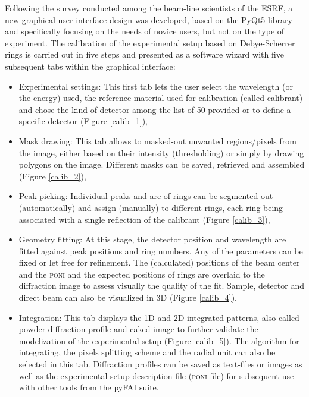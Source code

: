 \documentclass[preprint]{iucr}              %
\begin{document}
Following the survey conducted among the beam-line scientists of the ESRF, a
new graphical user interface design was developed, based on the PyQt5
library \cite{pyqt} and specifically focusing on the needs of novice users, but
not on the type of experiment.
The calibration of the experimental setup based on Debye-Scherrer rings 
is carried out in five steps and presented as a software wizard with five
subsequent tabs within the graphical interface:
\begin{itemize}
  \item{Experimental settings:} This first tab lets the user select
  the wavelength (or the energy) used, the reference material used
  for calibration (called calibrant) and chose the kind of detector among the
  list of 50 provided or to define a specific detector (Figure \ref{calib_1}),
  \item{Mask drawing:} This tab allows to masked-out unwanted regions/pixels from the
  image, either based on their intensity (thresholding) or simply by
  drawing polygons on the image. Different masks can be saved, retrieved and assembled (Figure \ref{calib_2}),
  \item{Peak picking:} Individual peaks and arc of rings can be segmented out
  (automatically) and assign (manually) to different rings, each ring 
  being associated with a single reflection of the calibrant (Figure
  \ref{calib_3}),
  \item{Geometry fitting:} At this stage, the detector position and
  wavelength are fitted against peak positions and ring numbers. 
  Any of the  parameters can be fixed or let free for refinement.
  The (calculated) positions of the beam center and the \textsc{poni}
  and the expected positions of rings are overlaid to the diffraction image
  to assess visually the quality of the fit. Sample, detector 
  and direct beam can also be visualized in 3D (Figure \ref{calib_4}). 
  \item{Integration:} This tab displays the 1D and 2D integrated patterns, also
  called powder diffraction profile and caked-image to further validate the
  modelization of the experimental setup (Figure \ref{calib_5}). 
  The algorithm for integrating, the pixels splitting scheme and the radial unit
  can also be selected in this tab. 
  Diffraction profiles can be saved as text-files or images as well as the
  experimental setup description file (\textsc{poni}-file) for subsequent use with other tools from
  the pyFAI suite.
\end{itemize}
\end{document}
